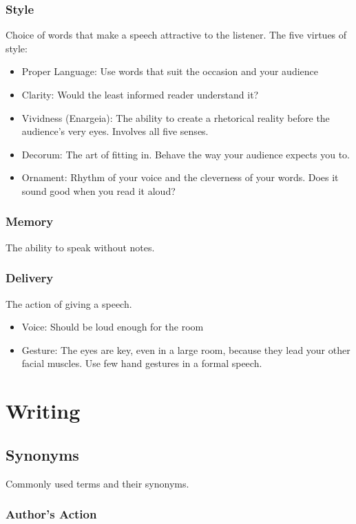 \subsection{Style}
Choice of words that make a speech attractive to the listener. The five virtues of style:
\begin{itemize}
	\item Proper Language: Use words that suit the occasion and your audience
	\item Clarity: Would the least informed reader understand it?
	\item Vividness (Enargeia): The ability to create a rhetorical reality before the audience's very eyes. Involves all five senses.
	\item Decorum: The art of fitting in. Behave the way your audience expects you to.
	\item Ornament: Rhythm of your voice and the cleverness of your words. Does it sound good when you read it aloud?
\end{itemize}
	
\subsection{Memory}
The ability to speak without notes.

\subsection{Delivery}
The action of giving a speech.
\begin{itemize}
	\item Voice: Should be loud enough for the room
	\item Gesture: The eyes are key, even in a large room, because they lead your other facial muscles. Use few hand gestures in a formal speech.
\end{itemize}

\chapter{Writing}
\section{Synonyms}
Commonly used terms and their synonyms.

\subsection{Author's Action}

